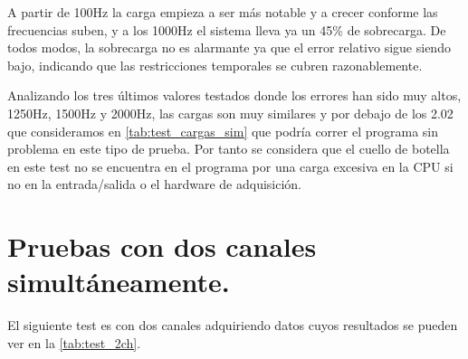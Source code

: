 A partir de 100Hz la carga empieza a ser más notable y a crecer conforme las frecuencias suben, y a los 1000Hz el sistema lleva ya un 45\% de sobrecarga. De todos modos, la sobrecarga no es alarmante ya que el error relativo sigue siendo bajo, indicando que las restricciones temporales se cubren razonablemente.

Analizando los tres últimos valores testados donde los errores han sido muy altos, 1250Hz, 1500Hz y 2000Hz, las cargas son muy similares y por debajo de los 2.02 que consideramos en \ref{tab:test_cargas_sim} que podría correr el programa sin problema en este tipo de prueba. Por tanto se considera que el cuello de botella en este test no se encuentra en el programa por una carga excesiva en la CPU si no en la entrada/salida o el hardware de adquisición.

\section{Pruebas con dos canales simultáneamente.}
El siguiente test es con dos canales adquiriendo datos cuyos resultados se pueden ver en la \autoref{tab:test_2ch}. 
